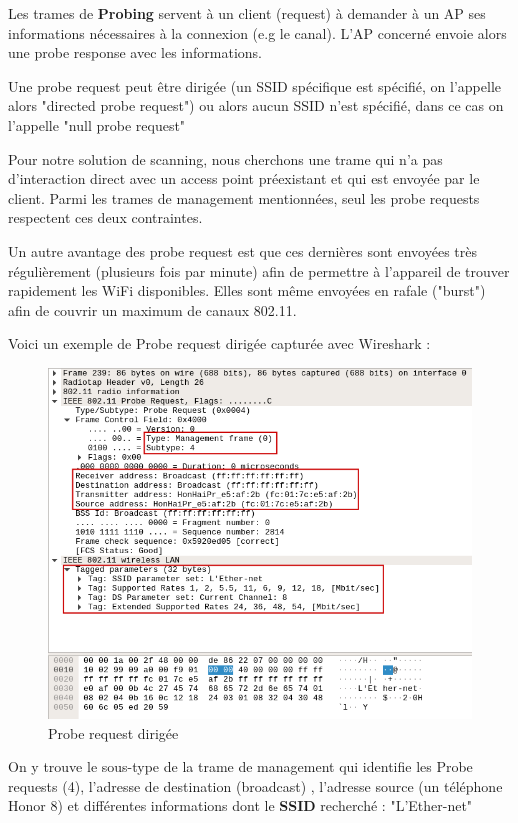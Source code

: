 Les trames de \textbf{Probing} servent à un client (request) à demander à un AP ses informations nécessaires à la connexion (e.g le canal).
L'AP concerné envoie alors une probe response avec les informations. 

Une probe request peut être dirigée (un SSID spécifique est spécifié, on l'appelle alors "directed probe request") ou alors aucun SSID n'est spécifié, dans ce cas
on l'appelle "null probe request"

Pour notre solution de scanning, nous cherchons une trame qui n'a pas d'interaction direct avec un access point préexistant
et qui est envoyée par le client. Parmi les trames de management mentionnées, seul les probe requests respectent ces deux contraintes.

Un autre avantage des probe request est que ces dernières sont envoyées très régulièrement (plusieurs fois par minute)
afin de permettre à l'appareil de trouver rapidement les WiFi disponibles. Elles sont même envoyées en rafale ("burst") afin de couvrir
un maximum de canaux 802.11.

Voici un exemple de Probe request dirigée capturée avec Wireshark :
\begin{figure}[H]
	\centering
	\includegraphics[width=14cm]{images/probe/directed_probe.png}
	\caption{Probe request dirigée}
	\label{fig:directedprobe}
\end{figure}

On y trouve le sous-type de la trame de management qui identifie les Probe requests (4), l'adresse de destination (broadcast)
, l'adresse source (un téléphone Honor 8) et différentes informations dont le \textbf{SSID} recherché : "L'Ether-net"

